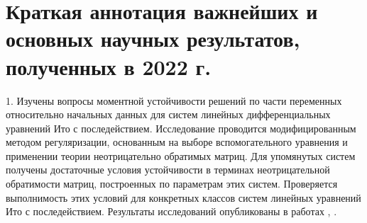 

% 

\chapter{Краткая аннотация важнейших и основных научных результатов,
полученных в 2022 г.}

1. Изучены вопросы моментной устойчивости решений по части
переменных относительно начальных данных для систем линейных
дифференциальных уравнений Ито с последействием. Исследование
проводится модифицированным методом регуляризации, основанным на
выборе вспомогательного уравнения и применении теории неотрицательно
обратимых матриц. Для упомянутых систем получены достаточные условия
устойчивости в терминах неотрицательной обратимости матриц,
построенных по параметрам этих систем. Проверяется выполнимость этих
условий для конкретных классов систем линейных уравнений Ито с
последействием. Результаты исследований опубликованы в работах \cite{bib:kad-1},
\cite{bib:kad-2}.
\smallskip

